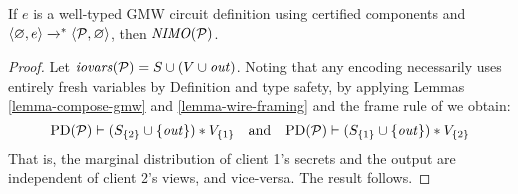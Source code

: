 \begin{theorem}
  \label{theorem-gmw-NIMO}
  If $e$ is a well-typed GMW circuit definition using certified
  components and $\langle \varnothing,e \rangle \xrightarrow{}^{*}
  \langle \mathcal{P},\varnothing \rangle$, then $\mathit{NIMO}(\mathcal{P})$.
\end{theorem}
\begin{proof}
  Let $\mathit{iovars}(\mathcal{P}) = S \cup (V \cup \mathit{out})$. Noting that any encoding
  necessarily uses entirely fresh variables by Definition and type
  safety, by applying Lemmas \ref{lemma-compose-gmw} and
  \ref{lemma-wire-framing} and the frame rule of
  \cite{barthe2019probabilistic} we obtain:
  $$
  \mathrm{PD}(\mathcal{P}) \vdash (S_{\{2\}}\cup\{\mathit{out}\}) * V_{\{1\}}
  \quad \text{and} \quad \mathrm{PD}(\mathcal{P}) \vdash (S_{\{1\}}\cup\{\mathit{out}\}) * V_{\{2\}}
  $$
  That is, the marginal distribution of client 1's secrets and the output are independent
  of client 2's views, and vice-versa. The result follows. 
\end{proof}

